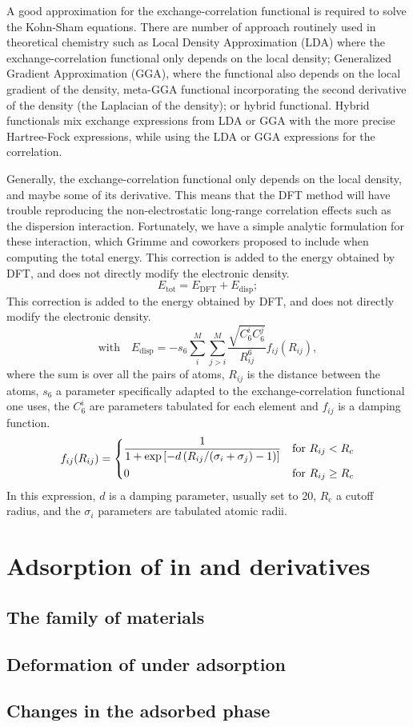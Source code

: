 \documentclass[thesis]{subfiles}
\begin{document}
A good approximation for the exchange-correlation functional is required to
solve the Kohn-Sham equations. There are number of approach routinely used in
theoretical chemistry such as Local Density Approximation (LDA) where the
exchange-correlation functional only depends on the local density; Generalized
Gradient Approximation (GGA), where the functional also depends on the local
gradient of the density, meta-GGA functional incorporating the second derivative
of the density (the Laplacian of the density); or hybrid functional. Hybrid
functionals mix exchange expressions from LDA or GGA with the more precise
Hartree-Fock  expressions, while using the LDA or GGA
expressions for the correlation.

Generally, the exchange-correlation functional only depends on the local
density, and maybe some of its derivative. This means that the DFT method will
have trouble reproducing the non-electrostatic long-range correlation effects
such as the dispersion interaction. Fortunately, we have a simple analytic
formulation for these interaction, which Grimme and coworkers\cite{Grimme2006}
proposed to include when computing the total energy. This correction is added to
the energy obtained by DFT, and does not directly modify the electronic density.
\[E_\text{tot} = E_\text{DFT} + E_\text{disp}; \]
This correction is added to the energy obtained by DFT, and does not directly
modify the electronic density.
\[\text{with}\quad E_\text{disp} = - s_6 \sum_i^M\sum_{j>i}^M\frac{\sqrt{C_6^i C_6^j}}{R_{ij}^6} f_{ij}(R_{ij}),\]
where the sum is over all the pairs of atoms, $R_{ij}$ is the distance between
the atoms, $s_6$ a parameter specifically adapted to the exchange-correlation
functional one uses, the $C_6^i$ are parameters tabulated for each element and
$f_{ij}$ is a damping function.
\[f_{ij}(R_{ij}) =
\begin{dcases}
    \frac{1}{1 + \exp\left[-d \left(R_{ij} / (\sigma_i + \sigma_j) -1\right)\right]} &\text{for } R_{ij} < R_c \\
    0 &\text{for } R_{ij} \geq R_c \\
\end{dcases}\]
In this expression, $d$ is a damping parameter, usually set to 20, $R_c$ a
cutoff radius, and the $\sigma_i$ parameters are tabulated atomic \vdW radii.

\section{Adsorption of  in  and derivatives}

\subsection{The  family of materials}

\subsection{Deformation of  under adsorption}

\subsection{Changes in the adsorbed phase}

\OnlyInSubfile{\printbibliography}
\end{document}

